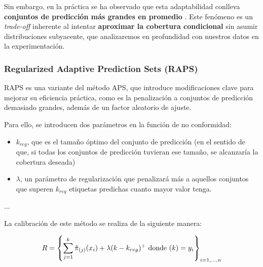 Sin embargo, en la práctica se ha observado que esta adaptabilidad conlleva \textbf{conjuntos de predicción 
más grandes en promedio} \cite{romano2020, angelopoulos2020}. 
Este fenómeno es un \textit{trade-off} inherente al intentar \textbf{aproximar la cobertura condicional} sin 
asumir distribuciones subyacente, que analizaremos en profundidad con nuestros datos en la experimentación. 


\subsubsection{Regularized Adaptive Prediction Sets (RAPS)}

RAPS \cite{angelopoulos2020} es una variante del método APS, que introduce modificaciones clave para mejorar
su eficiencia práctica, como es la penalización a conjuntos de predicción demasiado grandes, además de un
factor aleatorio de ajuste. 

Para ello, se introducen dos parámetros en la función de no conformidad:

\begin{itemize}
    \item $k_{reg}$, que es el tamaño óptimo del conjunto de predicción (en el sentido de que, si todas los 
    conjuntos de predicción tuvieran ese tamaño, se alcanzaría la cobertura deseada)
    \item $\lambda$, un parámetro de regularización que penalizará más a aquellos conjuntos que superen 
    $k_{reg}$ etiquetas predichas cuanto mayor valor tenga.
\end{itemize}

... 

La calibración de este método se realiza de la siguiente manera:

$$
R = \left\{ \sum_{j=1}^k \hat{\pi}_{(j)}(x_i) + \lambda (k-k_{reg})^+ \\
\textnormal{ donde } (k)=y_i \right\}_{i=1,...,n}
$$






